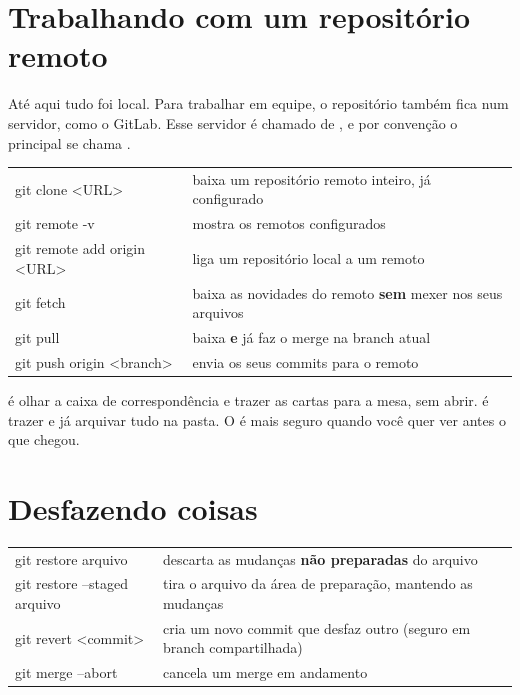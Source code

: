 \section{Trabalhando com um repositório remoto}

Até aqui tudo foi local. Para trabalhar em equipe, o repositório também fica num servidor, como o GitLab. Esse servidor é chamado de , e por convenção o principal se chama .

\begin{center}
\renewcommand{\arraystretch}{1.3}
\begin{tabularx}{0.95\linewidth}{@{}>{\ttfamily\color{azulMB}}l X@{}}
\toprule
git clone <URL> & baixa um repositório remoto inteiro, já configurado \\
git remote -v & mostra os remotos configurados \\
git remote add origin <URL> & liga um repositório local a um remoto \\
git fetch & baixa as novidades do remoto \textbf{sem} mexer nos seus arquivos \\
git pull & baixa \textbf{e} já faz o merge na branch atual \\
git push origin <branch> & envia os seus commits para o remoto \\
\bottomrule
\end{tabularx}
\end{center}

\begin{analogia}
 é olhar a caixa de correspondência e trazer as cartas para a mesa, sem abrir.  é trazer e já arquivar tudo na pasta. O  é mais seguro quando você quer ver antes o que chegou.
\end{analogia}

\section{Desfazendo coisas}

\begin{center}
\renewcommand{\arraystretch}{1.3}
\begin{tabularx}{0.95\linewidth}{@{}>{\ttfamily\color{azulMB}}l X@{}}
\toprule
git restore arquivo & descarta as mudanças \textbf{não preparadas} do arquivo \\
git restore --staged arquivo & tira o arquivo da área de preparação, mantendo as mudanças \\
git revert <commit> & cria um novo commit que desfaz outro (seguro em branch compartilhada) \\
git merge --abort & cancela um merge em andamento \\
\bottomrule
\end{tabularx}
\end{center}

